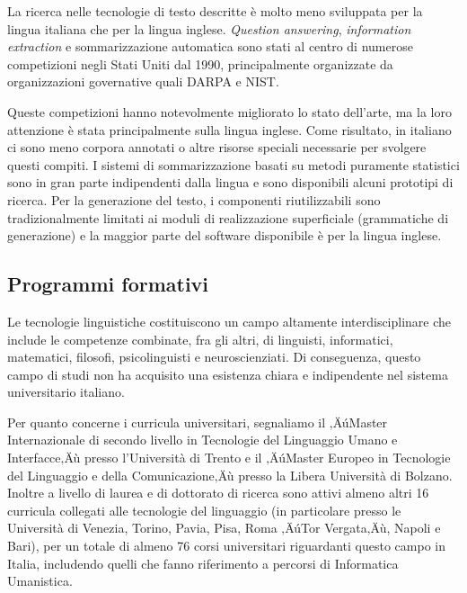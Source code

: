 \begin{multicols}{2}
La ricerca nelle tecnologie di testo descritte \`{e} molto meno sviluppata per la lingua italiana che per la lingua inglese. \emph{Question answering}, \emph{information extraction} e sommarizzazione automatica sono stati al centro di numerose competizioni negli Stati Uniti dal 1990, principalmente organizzate da organizzazioni governative quali DARPA e NIST. 


Queste competizioni hanno notevolmente migliorato lo stato dell'arte, ma la loro attenzione \`{e} stata principalmente sulla lingua inglese. Come risultato, in italiano ci sono meno corpora annotati o altre risorse speciali necessarie per svolgere questi compiti. I sistemi di sommarizzazione basati su  metodi puramente statistici sono in gran parte indipendenti dalla lingua e sono disponibili alcuni prototipi di ricerca. Per la generazione del testo, i componenti riutilizzabili sono tradizionalmente limitati ai moduli di realizzazione superficiale (grammatiche di generazione) e la maggior parte del software disponibile \`{e} per la lingua inglese.

\subsection{Programmi formativi}

Le tecnologie linguistiche costituiscono un campo altamente interdisciplinare che include le competenze combinate, fra gli altri, di linguisti, informatici, matematici, filosofi, psicolinguisti e neuroscienziati. Di conseguenza, questo campo di studi non ha acquisito una esistenza chiara e indipendente nel sistema universitario italiano.

Per quanto concerne i curricula universitari, segnaliamo il ‚ÄúMaster Internazionale di secondo livello in Tecnologie del Linguaggio Umano e Interfacce‚Äù presso l'Universit\`{a} di Trento e il ‚ÄúMaster Europeo in Tecnologie del Linguaggio e della Comunicazione‚Äù presso la Libera Universit\`{a} di Bolzano. Inoltre a livello di laurea e di dottorato di ricerca sono attivi almeno altri 16 curricula collegati alle tecnologie del linguaggio (in particolare presso le Universit\`{a} di Venezia, Torino, Pavia, Pisa, Roma ‚ÄúTor Vergata‚Äù, Napoli e Bari), per un totale di almeno 76 corsi universitari riguardanti questo campo in Italia, includendo quelli che fanno riferimento a percorsi di Informatica Umanistica.


\end{multicols}
